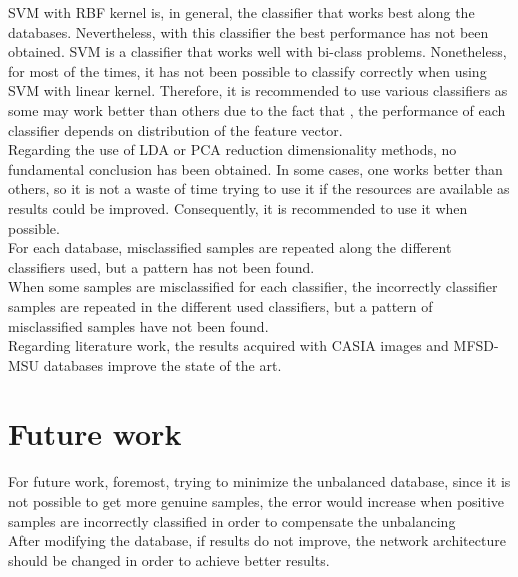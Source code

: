 SVM with RBF kernel is, in general, the classifier that works best along the databases. Nevertheless, with this classifier the best performance has not been obtained. SVM is a classifier that works well with bi-class problems. Nonetheless, for most of the times, it has not been possible to classify correctly when using SVM with linear kernel. Therefore, it is recommended to use various classifiers as some may work better than others due to the fact that , the performance of each classifier depends on distribution of the feature vector.\\

Regarding the use of LDA or PCA reduction dimensionality methods, no fundamental conclusion has been obtained. In some cases, one works better than others, so it is not a waste of time trying to use it if the resources are available as results could be improved. Consequently, it is recommended to use it when possible.\\

For each database, misclassified samples are repeated along the different classifiers used, but a pattern has not been found.\\

When some samples are misclassified for each classifier, the incorrectly classifier samples are repeated in the different used classifiers, but a pattern of misclassified samples have not been found.\\

Regarding literature work, the results acquired with CASIA images and MFSD-MSU databases improve the state of the art.

\section{Future work}
For future work, foremost, trying to minimize the unbalanced database, since it is not possible to get more genuine samples, the error would increase  when positive samples are incorrectly classified in order to compensate the unbalancing\\

After modifying the database, if results do not improve, the network architecture should be changed in order to achieve better results.\\

